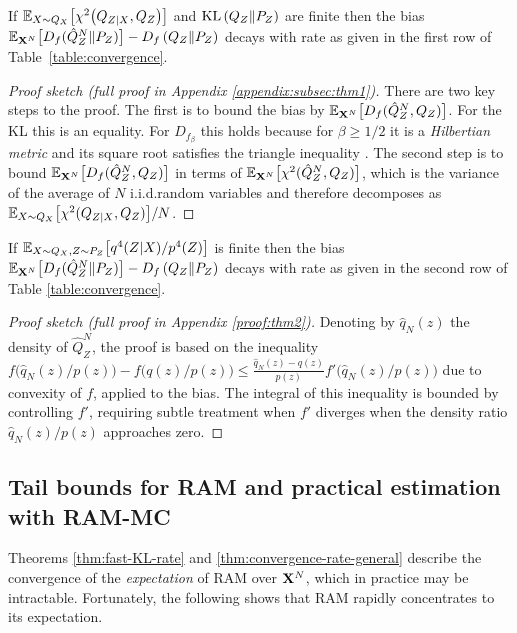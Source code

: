 \begin{theorem}\label{thm:fast-KL-rate}
If
$\mathbb{E}_{X\sim Q_X}\bigl[\chi^2\bigl(Q_{Z|X}, Q_Z\bigr)\bigr]$ and
$\mathrm{KL}\left( Q_{Z} \| P_Z\right)$ are finite then the bias ${\mathbb{E}_{\mathbf{X}^N}\bigl[D_f( \hat{Q}_Z^N \| P_Z)\bigr] - D_f\left( Q_{Z} \| P_Z\right)}$ decays with rate as given in the first row of Table~\ref{table:convergence}.
\end{theorem}
\begin{proof}[Proof sketch (full proof in Appendix \ref{appendix:subsec:thm1})]
There are two key steps to the proof. 
The first is to bound the bias by ${\mathbb{E}_{\mathbf{X}^N}\big[D_f(\hat{Q}_Z^N, Q_Z)\big]}$. 
For the KL this is an equality. 
For ${D_{f_\beta}}$ this holds because for $\beta {\geq} 1/2$ it is a \emph{Hilbertian metric} and its square root satisfies the triangle inequality \citep{hein05hilbertian}.
The second step is to bound ${\mathbb{E}_{\mathbf{X}^N}\bigl[D_f(\hat{Q}_Z^N, Q_Z)\bigr]}$ in terms of ${\mathbb{E}_{\mathbf{X}^N}\bigl[\chi^2(\hat{Q}_Z^N, Q_Z)\bigr]}$, which is the variance of the average of $N$ i.i.d.\:random variables and therefore decomposes as ${\mathbb{E}_{X\sim Q_X}\bigl[\chi^2(Q_{Z|X}, Q_Z)\bigr] / N}$.
\end{proof}
%
\begin{theorem}\label{thm:convergence-rate-general}
If $\mathbb{E}_{X\sim Q_X, Z\sim P_Z}\bigl[ q^4(Z|X) / p^4(Z) \bigr]$ is finite then
the bias $\mathbb{E}_{\mathbf{X}^N}\bigl[D_f( \hat{Q}_Z^N \| P_Z)\bigr] - D_f\left( Q_{Z} \| P_Z\right)$ decays with rate as given in the second row of Table \ref{table:convergence}.
\end{theorem}
\begin{proof}[Proof sketch (full proof in Appendix \ref{proof:thm2})]
Denoting by $\hat{q}_N(z)$ the density of $\hat{Q}_Z^N$,
the proof is based on the inequality
$f\bigl(\hat{q}_N(z) / p(z)\bigr) - f\bigl(q(z) / p(z)\bigr)\leq \frac{\hat{q}_N(z) - q(z)}{p(z)} f'\bigl(\hat{q}_N(z) / p(z)\bigr)$ due to convexity of $f$, applied to the bias.
The integral of this inequality is bounded by controlling $f'$, requiring subtle treatment when $f'$ diverges when the density ratio $\hat{q}_N(z)/p(z)$ approaches zero.
\end{proof}

\subsection{Tail bounds for RAM and practical estimation with RAM-MC}

Theorems \ref{thm:fast-KL-rate} and \ref{thm:convergence-rate-general} describe the convergence of the  \emph{expectation} of RAM over $\mathbf{X}^N$, which in practice may be intractable.
Fortunately, the following shows that RAM rapidly concentrates to its expectation.


